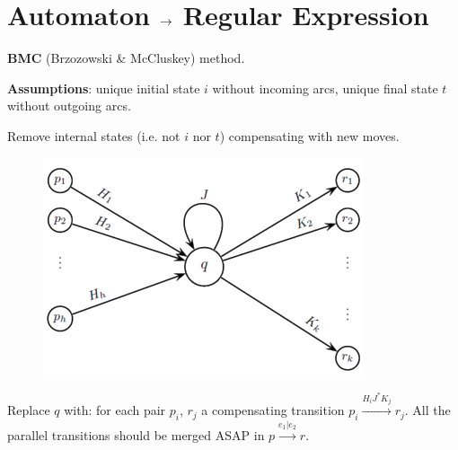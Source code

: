 \section{Automaton $\rightarrow$ Regular Expression}
\textbf{BMC} (Brzozowski \& McCluskey) method.

\textbf{Assumptions}: unique initial state $i$ without incoming arcs, unique final state $t$ without outgoing arcs.

Remove internal states (i.e. not $i$ nor $t$) compensating with new moves.

\begin{figure}[H]
    \centering
    \includegraphics[width=0.5\linewidth]{automata/bmc.png}
\end{figure}

Replace $q$ with: for each pair $p_i$, $r_j$ a compensating transition $p_i \xrightarrow{H_iJ^*K_j} r_j$. All the parallel transitions should be merged ASAP in $p \xrightarrow{e_1|e_2} r$.
